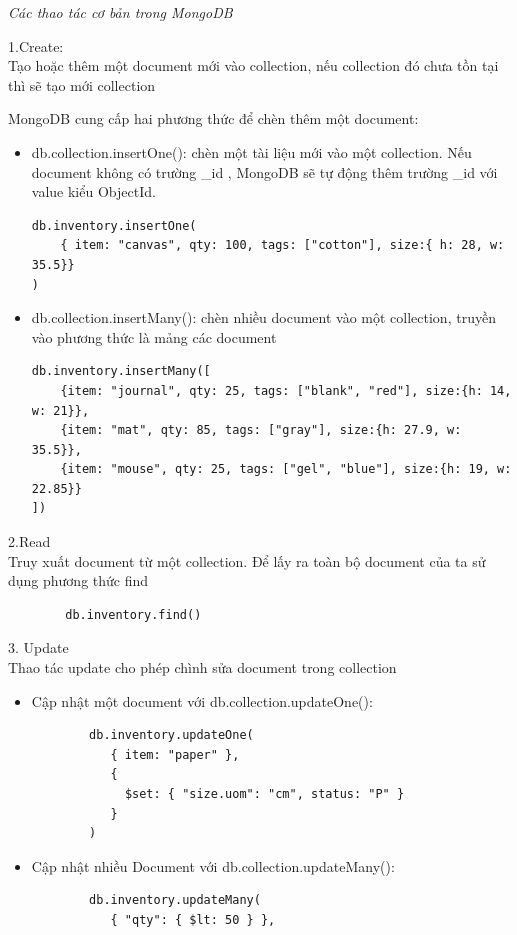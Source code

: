 \textit{Các thao tác cơ bản trong MongoDB}
\begin{description}
\item 1.Create:\\
Tạo hoặc thêm một document mới vào collection, nếu collection đó chưa tồn tại thì sẽ tạo mới collection

MongoDB cung cấp hai phương thức để chèn thêm một document:
\begin{itemize}
    \item db.collection.insertOne(): chèn một tài liệu mới vào một collection. Nếu document không có trường \_id , MongoDB sẽ tự động thêm trường \_id với value kiểu ObjectId.
\begin{verbatim}
db.inventory.insertOne(
    { item: "canvas", qty: 100, tags: ["cotton"], size:{ h: 28, w: 35.5}}
)
\end{verbatim}
    \item db.collection.insertMany(): chèn nhiều document vào một collection, truyền vào phương thức là mảng các document
\begin{verbatim}
db.inventory.insertMany([
    {item: "journal", qty: 25, tags: ["blank", "red"], size:{h: 14, w: 21}},
    {item: "mat", qty: 85, tags: ["gray"], size:{h: 27.9, w: 35.5}},
    {item: "mouse", qty: 25, tags: ["gel", "blue"], size:{h: 19, w: 22.85}}
])
\end{verbatim}
\end{itemize}
\item 2.Read\\
Truy xuất document từ một collection. Để lấy ra toàn bộ document của ta sử dụng phương thức find
\begin{verbatim}
        db.inventory.find()
\end{verbatim}
\item 3. Update\\
Thao tác update cho phép chình sửa document trong collection
\begin{itemize}
    \item Cập nhật một document với db.collection.updateOne():
    \begin{verbatim}
        db.inventory.updateOne(
           { item: "paper" },
           {
             $set: { "size.uom": "cm", status: "P" }
           }
        )
    \end{verbatim}
    \item Cập nhật nhiều Document với db.collection.updateMany():
    \begin{verbatim}
        db.inventory.updateMany(
           { "qty": { $lt: 50 } },

\end{verbatim}
\end{itemize}
\end{description}
